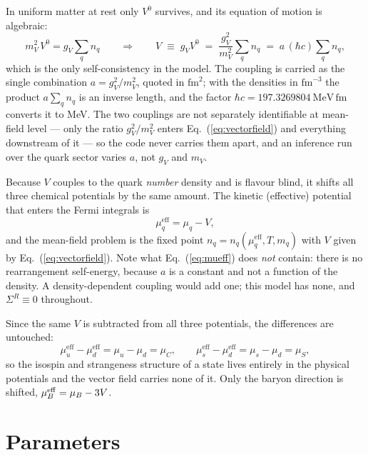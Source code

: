 \documentclass[aps,prc,onecolumn,superscriptaddress,nofootinbib,10pt]{revtex4-2}
\newcommand{\muB}{\mu_B}
\newcommand{\muC}{\mu_C}
\newcommand{\muS}{\mu_S}
\newcommand{\mueff}[1]{\mu^{\mathrm{eff}}_{#1}}
\begin{document}
In uniform matter at rest only $V^0$ survives, and its equation of motion is
algebraic:
%
\begin{equation}
m_V^2\, V^0 = g_V \sum_q n_q
\qquad\Longrightarrow\qquad
V \;\equiv\; g_V V^0 \;=\; \frac{g_V^2}{m_V^2} \sum_q n_q
        \;=\; a\, (\hbar c) \sum_q n_q ,
\label{eq:vectorfield}
\end{equation}
%
which is the only self-consistency in the model. The coupling is carried as
the single combination $a = g_V^2/m_V^2$, quoted in $\mathrm{fm}^2$; with the
densities in $\mathrm{fm}^{-3}$ the product $a \sum_q n_q$ is an inverse
length, and the factor $\hbar c = 197.3269804\ \mathrm{MeV\,fm}$ converts it
to MeV. The two couplings are not separately identifiable at mean-field level
--- only the ratio $g_V^2/m_V^2$ enters Eq.~(\ref{eq:vectorfield}) and
everything downstream of it --- so the code never carries them apart, and an
inference run over the quark sector varies $a$, not $g_V$ and $m_V$.

Because $V$ couples to the quark \emph{number} density and is flavour blind,
it shifts all three chemical potentials by the same amount. The kinetic
(effective) potential that enters the Fermi integrals is
%
\begin{equation}
\mueff{q} = \mu_q - V ,
\label{eq:mueff}
\end{equation}
%
and the mean-field problem is the fixed point $n_q = n_q(\mueff{q}, T, m_q)$
with $V$ given by Eq.~(\ref{eq:vectorfield}). Note what
Eq.~(\ref{eq:mueff}) does \emph{not} contain: there is no rearrangement
self-energy, because $a$ is a constant and not a function of the density. A
density-dependent coupling would add one; this model has none, and
$\Sigma^R \equiv 0$ throughout.

Since the same $V$ is subtracted from all three potentials, the differences
are untouched:
%
\begin{equation}
\mueff{u} - \mueff{d} = \mu_u - \mu_d = \muC , \qquad
\mueff{s} - \mueff{d} = \mu_s - \mu_d = \muS ,
\end{equation}
%
so the isospin and strangeness structure of a state lives entirely in the
physical potentials and the vector field carries none of it. Only the baryon
direction is shifted, $\muB^{\rm eff} = \muB - 3V$.

\section{Parameters}
\label{sec:parameters}
\end{document}

